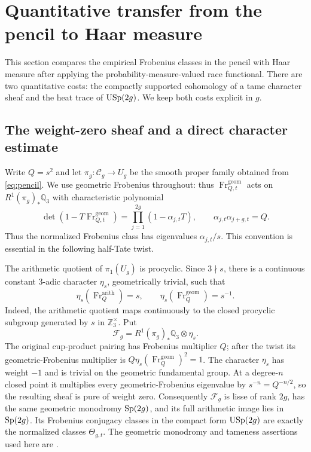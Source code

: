 \section{Quantitative transfer from the pencil to Haar measure}
\label{sec:transfer}

This section compares the empirical Frobenius classes in the pencil with
Haar measure after applying the probability-measure-valued race functional.
There are two quantitative costs: the compactly supported cohomology of a
tame character sheaf and the heat trace of \(\mathrm{USp}(2g)\).  We keep both costs
explicit in \(g\).

\subsection{The weight-zero sheaf and a direct character estimate}

Write \(Q=s^2\) and let
\(\pi_g:\mathcal C_g\to U_g\) be the smooth proper family obtained from
\eqref{eq:pencil}.  We use geometric Frobenius throughout: thus
\(\operatorname{Fr}^{\mathrm{geom}}_{Q,t}\) acts on
\(R^1(\pi_g)_*\mathbb Q_3\) with characteristic polynomial
\begin{equation}
 \det(1-T\operatorname{Fr}^{\mathrm{geom}}_{Q,t})
   =\prod_{j=1}^{2g}(1-\alpha_{j,t}T),
 \qquad \alpha_{j,t}\alpha_{j+g,t}=Q.
\label{eq:frob-convention}
\end{equation}
Thus the normalized Frobenius class has eigenvalues \(\alpha_{j,t}/s\).
This convention is essential in the following half-Tate twist.

The arithmetic quotient of \(\pi_1(U_g)\) is procyclic.  Since
\(3\nmid s\), there is a continuous constant \(3\)-adic character
\(\eta_s\), geometrically trivial, such that
\begin{equation}
 \eta_s(\operatorname{Fr}^{\mathrm{arith}}_Q)=s,
 \qquad
 \eta_s(\operatorname{Fr}^{\mathrm{geom}}_Q)=s^{-1}.
\label{eq:half-tate-character}
\end{equation}
Indeed, the arithmetic quotient maps continuously to the closed procyclic
subgroup generated by \(s\) in \(\mathbb Z_3^\times\).  Put
\[
 \mathcal F_g=R^1(\pi_g)_*\mathbb Q_3\otimes\eta_s.
\]
The original cup-product pairing has Frobenius multiplier \(Q\); after the
twist its geometric-Frobenius multiplier is
\(Q\eta_s(\operatorname{Fr}^{\mathrm{geom}}_Q)^2=1\).  The character
\(\eta_s\) has weight \(-1\) and is trivial on the geometric fundamental
group.  At a degree-\(n\) closed point it multiplies every geometric-Frobenius
eigenvalue by \(s^{-n}=Q^{-n/2}\), so the resulting sheaf is pure of weight
zero.  Consequently \(\mathcal F_g\)
is lisse of rank \(2g\), has the same geometric
monodromy \(\mathrm{Sp}(2g)\), and its full arithmetic image lies in \(\mathrm{Sp}(2g)\).
Its Frobenius conjugacy classes in the compact form \(\mathrm{USp}(2g)\) are exactly
the normalized classes \(\Theta_{g,t}\).  The geometric monodromy and
tameness assertions used here are
\cite[Theorem~10.1.16 and Lemma~10.1.12]{KatzSarnak1999}.

